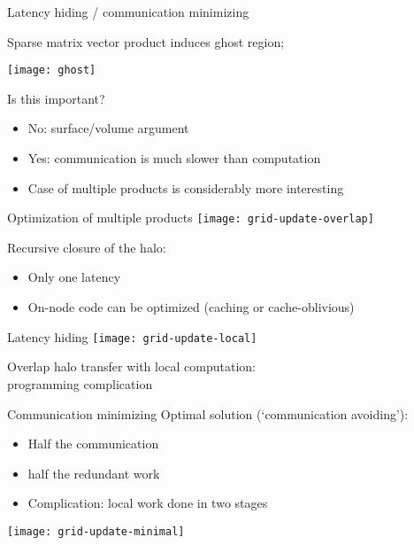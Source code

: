 
 {Latency hiding / communication minimizing}

\begin{frame}
Sparse matrix vector product induces ghost region;

\texttt{[image: ghost]}

Is this important?
\begin{itemize}
\item No: surface/volume argument
\item Yes: communication is much slower than computation
\item Case of multiple products is considerably more interesting
\end{itemize}
\end{frame}

\begin{frame}{Optimization of multiple products}
\texttt{[image: grid-update-overlap]}

Recursive closure of the halo:
\begin{itemize}
\item Only one latency
\item On-node code can be optimized (caching or cache-oblivious)
\end{itemize}
\end{frame}

\begin{frame}{Latency hiding}
  \texttt{[image: grid-update-local]}

Overlap halo transfer with local computation:\\
programming complication
\end{frame}

\begin{frame}{Communication minimizing}
Optimal solution (`communication avoiding'):
\begin{itemize}
\item Half the communication
\item half the redundant work
\item Complication: local work done in two stages
\end{itemize}
  \texttt{[image: grid-update-minimal]}
\end{frame}

